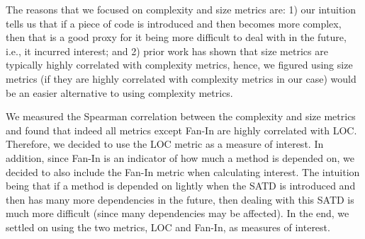 \documentclass[review]{elsarticle}
\begin{document}
The reasons that we focused on complexity and size metrics are: 1) our intuition tells us that if a piece of code is introduced and then becomes more complex, then that is a good proxy for it being more difficult to deal with in the future, i.e., it incurred interest; and 2) prior work has shown that size metrics are typically highly correlated with complexity metrics, hence, we figured using size metrics (if they are highly correlated with complexity metrics in our case) would be an easier alternative to using complexity metrics.

We measured the Spearman correlation between the complexity and size metrics and found that indeed all metrics except Fan-In are highly correlated with LOC. Therefore, we decided to use the LOC metric as a measure of interest. In addition, since Fan-In is an indicator of how much a method is depended on, we decided to also include the Fan-In metric when calculating interest. The intuition being that if a method is depended on lightly when the SATD is introduced and then has many more dependencies in the future, then dealing with this SATD is much more difficult (since many dependencies may be affected). In the end, we settled on using the two metrics, LOC and Fan-In, as measures of interest.

\end{document}
